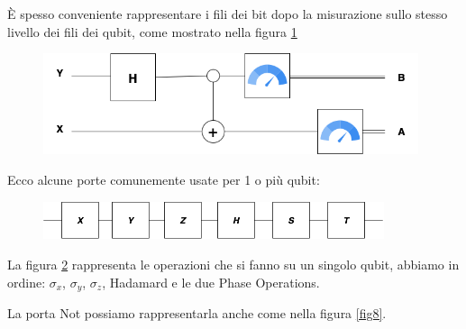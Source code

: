 È spesso conveniente rappresentare i fili dei bit dopo la misurazione sullo stesso livello dei fili dei
qubit, come mostrato nella figura \ref{fig6}

\begin{figure}[h]
    \centering
    \includegraphics[width = 11cm]{./Images/mis.png}
    \caption{}
    \label{fig6}
\end{figure}

Ecco alcune porte comunemente usate per 1 o più qubit:

\begin{figure}[h]
    \centering
    \includegraphics[width = 10cm]{./Images/Pauli.png}
    \caption{}
    \label{fig7}
\end{figure}

La figura \ref{fig7} rappresenta le operazioni che si fanno su un singolo qubit, abbiamo
in ordine: $\sigma_x$, $\sigma_y$, $\sigma_z$, Hadamard e le due Phase Operations.


La porta Not possiamo rappresentarla anche come nella figura \ref{fig8}.

